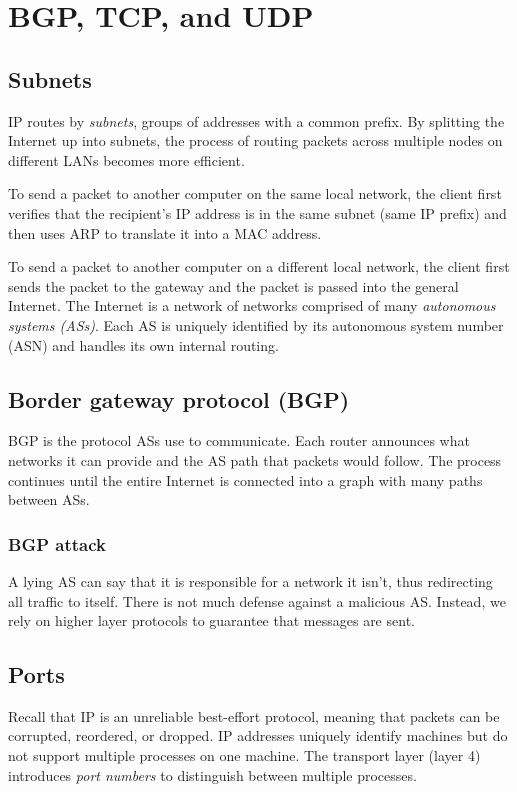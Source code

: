 \chapter{BGP, TCP, and UDP}

\section{Subnets}
IP routes by \emph{subnets}, groups of addresses with a common prefix. By splitting the Internet up into subnets, the process of routing packets across multiple nodes on different LANs becomes more efficient. 

\medskip
To send a packet to another computer on the same local network, the client first verifies that the recipient's IP address is in the same subnet (same IP prefix) and then uses ARP to translate it into a MAC address.

\medskip
To send a packet to another computer on a different local network, the client first sends the packet to the gateway and the packet is passed into the general Internet. The Internet is a network of networks comprised of many \emph{autonomous systems (ASs)}. Each AS is uniquely identified by its autonomous system number (ASN) and handles its own internal routing.

\section{Border gateway protocol (BGP)}
BGP is the protocol ASs use to communicate. Each router announces what networks it can provide and the AS path that packets would follow. The process continues until the entire Internet is connected into a graph with many paths between ASs.

\subsection{BGP attack}
A lying AS can say that it is responsible for a network it isn't, thus redirecting all traffic to itself. There is not much defense against a malicious AS. Instead, we rely on higher layer protocols to guarantee that messages are sent.

\section{Ports}
Recall that IP is an unreliable best-effort protocol, meaning that packets can be corrupted, reordered, or dropped. IP addresses uniquely identify machines but do not support multiple processes on one machine. The transport layer (layer 4) introduces \emph{port numbers} to distinguish between multiple processes.

